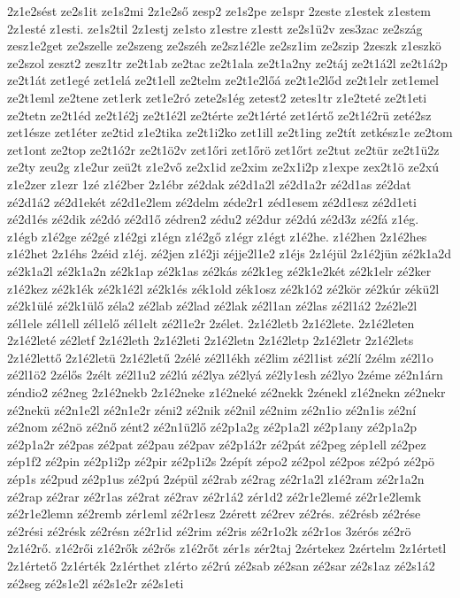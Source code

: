 {2z1e2sést
ze2s1it
ze1s2mi
2z1e2ső
zesp2
ze1s2pe
ze1spr
2zeste
z1estek
z1estem
2z1esté
z1esti.
ze1s2til
2z1estj
ze1sto
z1estre
z1estt
ze2s1ü2v
zes3zac
ze2szág
zesz1e2get
ze2szelle
ze2szeng
ze2széh
ze2sz1é2le
ze2sz1im
ze2szip
2zeszk
z1eszkö
ze2szol
zeszt2
zesz1tr
ze2t1ab
ze2tac
ze2t1ala
ze2t1a2ny
ze2táj
ze2t1á2l
ze2t1á2p
ze2t1át
zet1egé
zet1elá
ze2t1ell
ze2telm
ze2t1e2lőá
ze2t1e2lőd
ze2t1elr
zet1emel
ze2t1eml
ze2tene
zet1erk
zet1e2ró
zete2s1ég
zetest2
zetes1tr
z1e2teté
ze2t1eti
ze2tetn
ze2t1éd
ze2t1é2j
ze2t1é2l
ze2térte
ze2t1érté
zet1értő
ze2t1é2rü
zeté2sz
zet1észe
zet1éter
ze2tid
z1e2tika
ze2t1i2ko
zet1ill
ze2t1ing
ze2tít
zetkész1e
ze2tom
zet1ont
ze2top
ze2t1ó2r
ze2t1ö2v
zet1őri
zet1őrö
zet1őrt
ze2tut
ze2tür
ze2t1ü2z
ze2ty
zeu2g
z1e2ur
zeü2t
z1e2vő
ze2x1id
ze2xim
ze2x1i2p
z1expe
zex2t1ö
ze2xú
z1e2zer
z1ezr
1zé
z1é2ber
2z1ébr
zé2dak
zé2d1a2l
zé2d1a2r
zé2d1as
zé2dat
zé2d1á2
zé2d1ekét
zé2d1e2lem
zé2delm
zéde2r1
zéd1esem
zé2d1esz
zé2d1eti
zé2d1és
zé2dik
zé2dó
zé2d1ő
zédren2
zédu2
zé2dur
zé2dú
zé2d3z
zé2fá
z1ég.
z1égb
z1é2ge
zé2gé
z1é2gi
z1égn
z1é2gő
z1égr
z1égt
z1é2he.
z1é2hen
2z1é2hes
z1é2het
2z1éhs
2zéid
z1éj.
zé2jen
z1é2ji
zéjje2l1e2
z1éjs
2z1éjül
2z1é2jün
zé2k1a2d
zé2k1a2l
zé2k1a2n
zé2k1ap
zé2k1as
zé2kás
zé2k1eg
zé2k1e2két
zé2k1elr
zé2ker
z1é2kez
zé2k1ék
zé2k1é2l
zé2k1és
zék1old
zék1osz
zé2k1ó2
zé2kör
zé2kúr
zékü2l
zé2k1ülé
zé2k1ülő
zéla2
zé2lab
zé2lad
zé2lak
zé2l1an
zé2las
zé2l1á2
2zé2le2l
zél1ele
zél1ell
zél1elő
zél1elt
zé2l1e2r
2zélet.
2z1é2letb
2z1é2lete.
2z1é2leten
2z1é2leté
zé2letf
2z1é2leth
2z1é2leti
2z1é2letn
2z1é2letp
2z1é2letr
2z1é2lets
2z1é2lettő
2z1é2letü
2z1é2letű
2zélé
zé2l1ékh
zé2lim
zé2l1ist
zé2lí
2zélm
zé2l1o
zé2l1ö2
2zélős
2zélt
zé2l1u2
zé2lú
zé2lya
zé2lyá
zé2ly1esh
zé2lyo
2zéme
zé2n1árn
zéndio2
zé2neg
2z1é2nekb
2z1é2neke
z1é2neké
zé2nekk
2zénekl
z1é2nekn
zé2nekr
zé2nekü
zé2n1e2l
zé2n1e2r
zéni2
zé2nik
zé2nil
zé2nim
zé2n1io
zé2n1is
zé2ní
zé2nom
zé2nö
zé2nő
zént2
zé2n1ü2lő
zé2p1a2g
zé2p1a2l
zé2p1any
zé2p1a2p
zé2p1a2r
zé2pas
zé2pat
zé2pau
zé2pav
zé2p1á2r
zé2pát
zé2peg
zép1ell
zé2pez
zép1f2
zé2pin
zé2p1i2p
zé2pir
zé2p1i2s
2zépít
zépo2
zé2pol
zé2pos
zé2pó
zé2pö
zép1s
zé2pud
zé2p1us
zé2pú
2zépül
zé2rab
zé2rag
zé2r1a2l
z1é2ram
zé2r1a2n
zé2rap
zé2rar
zé2r1as
zé2rat
zé2rav
zé2r1á2
zér1d2
zé2r1e2lemé
zé2r1e2lemk
zé2r1e2lemn
zé2remb
zér1eml
zé2r1esz
2zérett
zé2rev
zé2rés.
zé2résb
zé2rése
zé2rési
zé2résk
zé2résn
zé2r1id
zé2rim
zé2ris
zé2r1o2k
zé2r1os
3zérós
zé2rö
2z1é2rő.
z1é2rői
z1é2rők
zé2rős
z1é2rőt
zér1s
zér2taj
2zértekez
2zértelm
2z1értetl
2z1értető
2z1érték
2z1érthet
z1érto
zé2rú
zé2sab
zé2san
zé2sar
zé2s1az
zé2s1á2
zé2seg
zé2s1e2l
zé2s1e2r
zé2s1eti
}
